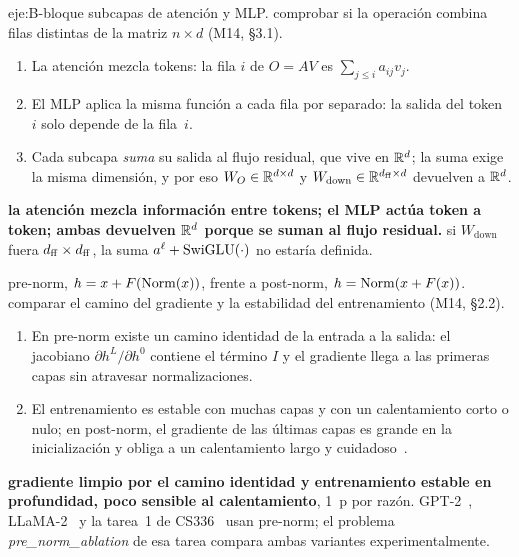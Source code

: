 \begin{solucion}{eje:B-bloque}
\datos subcapas de atención y MLP.
\planteamiento comprobar si la operación combina filas distintas de la matriz $n\times d$ (M14, §3.1).
\pasos
\begin{enumerate}[label=\arabic*.]
  \item La atención mezcla tokens: la fila $i$ de $O=AV$ es $\sum_{j\le i}a_{ij}v_j$.
  \item El MLP aplica la misma función a cada fila por separado: la salida del token~$i$ solo depende de la fila~$i$.
  \item Cada subcapa \emph{suma} su salida al flujo residual, que vive en $\mathbb{R}^{d}$; la suma exige la misma dimensión, y por eso $W_O\in\mathbb{R}^{d\times d}$ y $W_{\mathrm{down}}\in\mathbb{R}^{d_{\mathrm{ff}}\times d}$ devuelven a $\mathbb{R}^{d}$.
\end{enumerate}
\resultado \textbf{la atención mezcla información entre tokens; el MLP actúa token a token; ambas devuelven $\mathbb{R}^{d}$ porque se suman al flujo residual.}
\comprobacion si $W_{\mathrm{down}}$ fuera $d_{\mathrm{ff}}\times d_{\mathrm{ff}}$, la suma $a^{\ell}+\operatorname{SwiGLU}(\cdot)$ no estaría definida.

\datos pre-norm, $h=x+F(\operatorname{Norm}(x))$, frente a post-norm, $h=\operatorname{Norm}(x+F(x))$.
\planteamiento comparar el camino del gradiente y la estabilidad del entrenamiento (M14, §2.2).
\pasos
\begin{enumerate}[label=\arabic*.]
  \item En pre-norm existe un camino identidad de la entrada a la salida: el jacobiano $\partial h^{L}/\partial h^{0}$ contiene el término $I$ y el gradiente llega a las primeras capas sin atravesar normalizaciones.
  \item El entrenamiento es estable con muchas capas y con un calentamiento corto o nulo; en post-norm, el gradiente de las últimas capas es grande en la inicialización y obliga a un calentamiento largo y cuidadoso~\cite{xiong}.
\end{enumerate}
\resultado \textbf{gradiente limpio por el camino identidad y entrenamiento estable en profundidad, poco sensible al calentamiento}, 1~p por razón.
\comprobacion GPT-2~\cite{gpt2}, LLaMA-2~\cite{llama2} y la tarea~1 de CS336~\cite[§3.4]{cs336} usan pre-norm; el problema \emph{pre\_norm\_ablation} de esa tarea compara ambas variantes experimentalmente.

\end{solucion}

